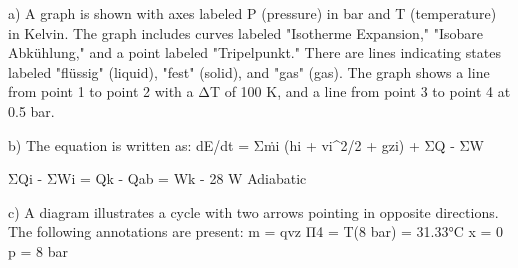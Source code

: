 a) A graph is shown with axes labeled P (pressure) in bar and T (temperature) in Kelvin. The graph includes curves labeled "Isotherme Expansion," "Isobare Abkühlung," and a point labeled "Tripelpunkt." There are lines indicating states labeled "flüssig" (liquid), "fest" (solid), and "gas" (gas). The graph shows a line from point 1 to point 2 with a ΔT of 100 K, and a line from point 3 to point 4 at 0.5 bar.

b) The equation is written as:
dE/dt = Σṁi (hi + vi^2/2 + gzi) + ΣQ - ΣW

ΣQi - ΣWi = Qk - Qab = Wk - 28 W
Adiabatic

c) A diagram illustrates a cycle with two arrows pointing in opposite directions. The following annotations are present: 
m = qvz
Π4 = T(8 bar) = 31.33°C
x = 0
p = 8 bar